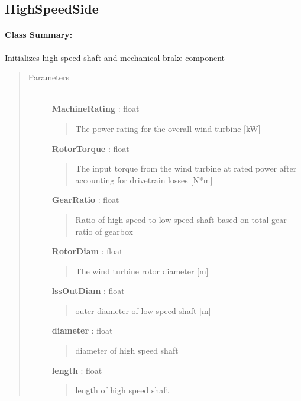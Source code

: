 \documentclass[letterpaper,10pt,openany,oneside]{sphinxmanual}
\begin{document}
\subsection{HighSpeedSide}
\label{documentation:highspeedside}\label{documentation:highspeedside-class-label}\paragraph{Class Summary:}

\begin{fulllineitems}
\label{documentation:nacelleSE.src.nacelle_components.HighSpeedSide}
Initializes high speed shaft and mechanical brake component
\begin{quote}\begin{description}
\item[{Parameters }] \leavevmode\\
\textbf{MachineRating} : float
\begin{quote}

The power rating for the overall wind turbine {[}kW{]}
\end{quote}

\textbf{RotorTorque} : float
\begin{quote}

The input torque from the wind turbine at rated power after accounting for drivetrain losses {[}N*m{]}
\end{quote}

\textbf{GearRatio} : float
\begin{quote}

Ratio of high speed to low speed shaft based on total gear ratio of gearbox
\end{quote}

\textbf{RotorDiam} : float
\begin{quote}

The wind turbine rotor diameter {[}m{]}
\end{quote}

\textbf{lssOutDiam} : float
\begin{quote}

outer diameter of low speed shaft {[}m{]}
\end{quote}

\textbf{diameter} : float
\begin{quote}

diameter of high speed shaft
\end{quote}

\textbf{length} : float
\begin{quote}

length of high speed shaft
\end{quote}

\end{description}\end{quote}

\end{fulllineitems}
\end{document}
